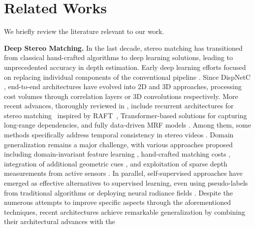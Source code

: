 \documentclass[10pt,twocolumn,letterpaper]{article}
\begin{document}
\phantom{Invisible Text}
\vspace{-\baselineskip}

\section{Related Works}

\label{sec:related}

We briefly review the literature relevant to our work.

    \textbf{Deep Stereo Matching.} In the last decade, stereo matching has transitioned from classical hand-crafted algorithms \cite{scharstein2002taxonomy} to deep learning solutions, leading to unprecedented accuracy in depth estimation. Early deep learning efforts focused on replacing individual components of the conventional pipeline \cite{zbontar2015computing,vzbontar2016stereo_MC-CNN,seki2017sgm, spyropoulos2014learning, tosi2024neural}. Since DispNetC \cite{mayer2016large}, end-to-end architectures have evolved into 2D \cite{yin2019hierarchical,liang2018learning_iResNet,song2019edgestereo, yin2019hierarchical} and 3D \cite{kendall2017end_GC-NET,yang2019hierarchical,zhang2019ga,bangunharcana2021correlate,Zeng_2023_ICCV,chang2018pyramid,guo2019group,shen2021cfnet,chen2023learning,shen2022pcw} approaches, processing cost volumes through correlation layers or 3D convolutions respectively. More recent advances, thoroughly reviewed in \cite{poggi2021synergies,laga2020survey,tosi2024survey}, include recurrent architectures for stereo matching~\cite{lipson2021raft,wang2024selective, chen2024mocha, zhao2023high, xu2023iterative, li2022practical, Jing_2023_ICCV, gong2024learning} inspired by RAFT~\cite{teed2020raft}, Transformer-based solutions \cite{Li_2021_ICCV_STTR, guo2022context_CEST, xu2023unifying, Su_2022_CVPR_Chitransformer, croco_v2,lou2023elfnet,zhang2024learning} for capturing long-range dependencies, and fully data-driven MRF models \cite{guan2024neural}. Among them, some methods specifically address temporal consistency in stereo videos \cite{Zhang2023TemporalStereo, Karaev_2023_CVPR, jing2024match, zeng2024temporally}. Domain generalization remains a major challenge, with various approaches proposed including domain-invariant feature learning \cite{zhang2019domaininvariant, Liu_2022_CVPR, Rao_2023_CVPR, Chuah_2022_CVPR, Song_2021_CVPR}, hand-crafted matching costs \cite{cai2020matchingspace, cheng2022revisiting}, integration of additional geometric cues \cite{aleotti2021neural, Pilzer_2023_WACV, tosi2024neural}, and exploitation of sparse depth measurements from active sensors \cite{poggi2019guided, bartolomei2023active, li2024stereo}. In parallel, self-supervised approaches \cite{godard2017unsupervised, Liu_2020_CVPR_Flow2Stereo} have emerged as effective alternatives to supervised learning, even using pseudo-labels from traditional algorithms \cite{tonioni2017unsupervised, aleotti2020reversing} or deploying neural radiance fields \cite{Tosi_2023_CVPR}. Despite the numerous attempts to improve specific aspects through the aforementioned techniques, recent architectures achieve remarkable generalization by combining their architectural advances with the 
\end{document}
